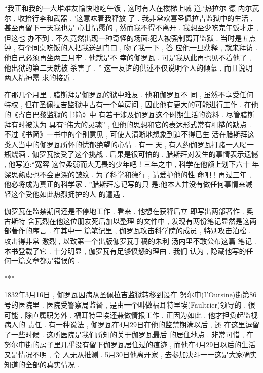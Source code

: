 “我正和我的一大堆难友愉快地吃午饭 , 这时有人在楼梯上喊 道:‘热拉尔 \textbullet 德 \textbullet 内尔瓦尔 , 收拾行李和武器 . ’这意味着我释放 了 . 我非常欢喜圣佩拉吉监狱中的生活 , 甚至再留下一天我也是 心甘情愿的 , 然而我不得不离开 . 我想至少吃完午饭才走 , 但这也 办不到 . 不久竟然出现一种奇怪的场面:犯人被强制离开监狱 .  当时是五点钟 , 有个同桌吃饭的人把我送到门口 , 吻了我一下 , 答 应他一旦获释 , 就来拜访 . 他自己必须再坐两三月牢 . 他就是不 幸的伽罗瓦 . 可是我从此再也见不着他了 , 他出狱的第二天就被 杀害了 . ”
这一友谊的供述不仅说明个人的倾慕 , 而且说明两人精神需 求的接近 . 

在那几个月里 , 腊斯拜是伽罗瓦的狱中难友 . 他和伽罗瓦不 同 , 虽然不享受任何特权 , 但在圣佩拉吉监狱中占有一个单房间 , 因此他有更大的可能进行工作 . 在他的《寄自巴黎监狱的书简》中 有若干涉及伽罗瓦这个时期生活的资料 . 尽管腊斯拜有时被认为 具有“伟大的灵魂” , 但他的思想和它的表达形式常有粗糙的缺点 .  不过《书简》一书中的个别意见 , 可使人清晰地想象到迫不得已生 活在腊斯拜这类人当中的伽罗瓦所怀的忧郁绝望的心情 . 有一 天 , 有人约伽罗瓦打赌一人喝一瓶烧酒 . 伽罗瓦接受了这个挑战 .  后果是很可怕的 . 腊斯拜对发生的事情表示遗憾 , 他写道:“宽容 这位柔弱而大无畏的少年吧！三年之中 , 科学在他额上划下六十 年深思熟虑也不会更深的皱纹 . 为了科学和德行 , 请爱护他的性 命吧！再过三年 , 他必将成为真正的科学家 . ”腊斯拜忘记写的只 是:他本人并没有做任何事情来减轻这个受他如此热烈拥护的人 的遭遇 . 

伽罗瓦在监禁期间还是不停地工作 . 看来 , 他想在获释后立 即写出两部著作 . 奥古斯特 \textbullet 舍瓦烈在他这位朋友死后加以整理 的文件中 , 发现有两份笔记显然是这两部著作的序言 . 在其中一 篇笔记里 , 伽罗瓦攻击科学院的成员 , 特别攻击泊松 . 攻击得非常 激烈 , 以致第一个出版伽罗瓦手稿的朱利-汤内里不敢公布这篇 笔记 . 本书登载了它 . 十分明显 , 伽罗瓦有足够愤怒的理由 , 我们 认为 , 隐藏他写的任何一篇文章都是错误的 . 

\begin{center}***
\end{center}

1832年3月16日 , 伽罗瓦因病从圣佩拉吉监狱转移到设在 努尔申(I'Oursine)街第86号的医院里 . 医院受警察局监督 , 是由一个叫做福耳特里埃(Faultrier)领导的 . 很可能 , 除直属职务外 ,  福耳特里埃还兼做情报工作 , 正因为如此 , 他才担负起监视病人的 责任 . 有一种说法 , 伽罗瓦在4月29日在他的监禁期满以后 , 还 在这里逗留了一些时候 . 这所医院是我们所知的关于伽罗瓦最后 的居住地点 . 非常可惜 , 在努尔申街的房子里几乎没有留下伽罗瓦居住过的痕迹 , 而他在4月29日以后的生活又是情况不明 , 令 人无从推测 . 5月30日他离开家 , 去参加决斗一一这是大家确实 知道的全部的真实情况 . 

